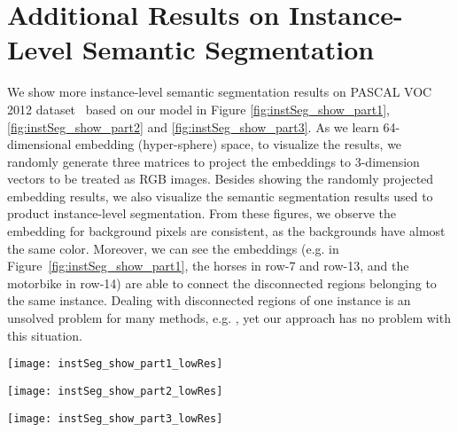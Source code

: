 \section{Additional Results on Instance-Level Semantic Segmentation}

We show more instance-level semantic segmentation results on PASCAL VOC 2012
dataset~\cite{everingham2010pascal} based on our model in Figure
\ref{fig:instSeg_show_part1}, \ref{fig:instSeg_show_part2} and
\ref{fig:instSeg_show_part3}.  
As we learn 64-dimensional embedding
(hyper-sphere) space, to visualize the results, we randomly generate three
matrices to project the embeddings to 3-dimension vectors to be treated as RGB
images.  Besides showing the randomly projected embedding results, we also
visualize the semantic segmentation results used to product instance-level
segmentation.  From these figures, we observe the embedding for background
pixels are consistent, as the backgrounds have almost the same color.
Moreover, we can see the embeddings (e.g. in
Figure~\ref{fig:instSeg_show_part1}, the horses in row-7 and row-13, and the
motorbike in row-14) are able to connect the disconnected regions belonging to
the same instance.  Dealing with disconnected regions of one instance is an
unsolved problem for many methods, e.g. \cite{bai2016deep,
kirillov2016instancecut}, yet our approach has no problem with this situation.

\begin{figure*}[t]
\centering
   \texttt{[image: instSeg\_show\_part1\_lowRes]}
   \caption{Visualization of generic and instance-level semantic segmentation
   with random projection of the embedding vectors (part-$1/3$).
   }
\label{fig:instSeg_show_part1}
\end{figure*}

\begin{figure*}[t]
\centering
   \texttt{[image: instSeg\_show\_part2\_lowRes]}
   \caption{Visualization of generic and instance-level semantic segmentation
   with random projection of the embedding vectors (part-$2/3$).
   }
\label{fig:instSeg_show_part2}
\end{figure*}

\begin{figure*}[t]
\centering
   \texttt{[image: instSeg\_show\_part3\_lowRes]}
   \caption{Visualization of generic and instance-level semantic segmentation
   with random projection of the embedding vectors (part-$3/3$).
   }
\label{fig:instSeg_show_part3}
\end{figure*}

